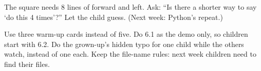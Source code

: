 \begin{stretchchallenge}
The square needs 8 lines of forward and left. Ask: \enquote{Is there a shorter way to say \enquote{do this 4 times}?} Let the child guess. (Next week: Python's repeat.)
\end{stretchchallenge}

\begin{teachernote}
Use three warm-up cards instead of five. Do 6.1 as the demo only, so children start with 6.2. Do the grown-up's hidden typo for one child while the others watch, instead of one each. Keep the file-name rules: next week children need to find their files.
\end{teachernote}
